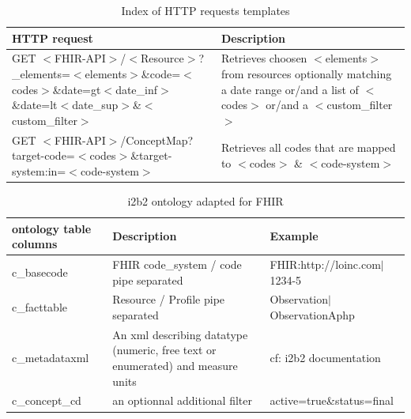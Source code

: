 \documentclass{amia}
\begin{document}
\begin{table}[h]
\centering
	\begin{tabular}{|p{6cm}|p{10cm}|}
  \hline
    \textbf{HTTP request}    & \textbf{Description}  \\ \hline
		GET $<$FHIR-API$>$/$<$Resource$>$\newline?\_elements=$<$elements$>$\&code=$<$codes$>$\newline\&date=gt$<$date\_inf$>$\&date=lt$<$date\_sup$>$\newline\&$<$custom\_filter$>$  & Retrieves choosen $<$elements$>$ from resources optionally matching a date range or/and a list of $<$codes$>$  or/and a $<$custom\_filter$>$     \\ \hline
	 GET $<$FHIR-API$>$/ConceptMap\newline?target-code=$<$codes$>$\newline\&target-system:in=$<$code-system$>$  & Retrieves all codes that are mapped to $<$codes$>$ \& $<$code-system$>$   \\ \hline
  \end{tabular}
\caption{Index of HTTP requests templates}
	\label{tab2}
\end{table}

\begin{table}[h]
\centering
	\begin{tabular}{|p{2cm}|p{6cm}|p{5cm}|}
  \hline
		\textbf{ontology table columns}    & \textbf{Description} & \textbf{Example} \\ \hline
		c\_basecode  &  FHIR code\_system / code pipe separated  & FHIR:http://loinc.com$|$1234-5  \\ \hline
		c\_facttable  &  Resource / Profile pipe separated  & Observation$|$ObservationAphp  \\ \hline
		c\_metadataxml  &  An xml describing datatype (numeric, free text or enumerated) and measure units  & cf: i2b2 documentation   \\ \hline
		c\_concept\_cd  &  an optionnal additional filter  & active=true\&status=final  \\ \hline
  \end{tabular}
\caption{i2b2 ontology adapted for FHIR}
	\label{tab1}
\end{table}
\end{document}
